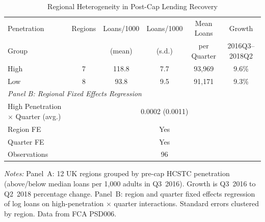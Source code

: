 \begin{table}[t]
\centering
\caption{Regional Heterogeneity in Post-Cap Lending Recovery}
\label{tab:regional}
\begin{threeparttable}\footnotesize
\begin{tabular}{@{}lccccc@{}}
\toprule
Penetration & Regions & Loans/1000 & Loans/1000 & Mean Loans & Growth \\
Group & & (mean) & (s.d.) & per Quarter & 2016Q3--2018Q2 \\
\midrule
High & 7 & 118.8 & 7.7 & 93,969 & 9.6\% \\
Low & 8 & 93.8 & 9.5 & 91,171 & 9.3\% \\
\midrule
\multicolumn{6}{l}{\textit{Panel B: Regional Fixed Effects Regression}} \\
\midrule
High Penetration $\times$ Quarter (avg.) & \multicolumn{5}{c}{0.0002 (0.0011)} \\
Region FE & \multicolumn{5}{c}{Yes} \\
Quarter FE & \multicolumn{5}{c}{Yes} \\
Observations & \multicolumn{5}{c}{96} \\
\bottomrule
\end{tabular}
\begin{tablenotes}\footnotesize
\item \textit{Notes:} Panel~A: 12 UK regions grouped by pre-cap HCSTC penetration (above/below median loans per 1,000 adults in Q3~2016). Growth is Q3~2016 to Q2~2018 percentage change. Panel~B: region and quarter fixed effects regression of log loans on high-penetration $\times$ quarter interactions. Standard errors clustered by region. Data from FCA PSD006.
\end{tablenotes}
\end{threeparttable}
\end{table}
